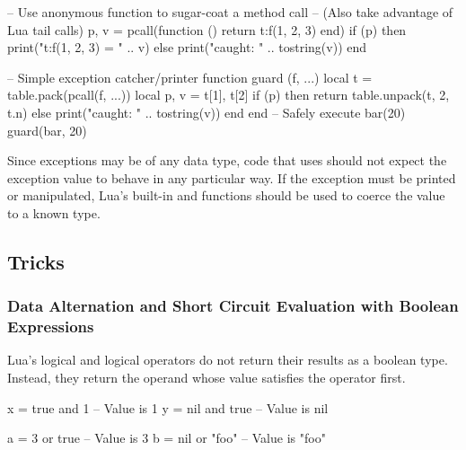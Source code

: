 \begin{LuaCode}
-- Use anonymous function to sugar-coat a method call
-- (Also take advantage of Lua tail calls)
p, v = pcall(function () return t:f(1, 2, 3) end)
if (p) then
	print("t:f(1, 2, 3) = " .. v)
else
	print("caught: " .. tostring(v))
end
\end{LuaCode}

\begin{LuaCode}
-- Simple exception catcher/printer
function guard (f, ...)
	local t = table.pack(pcall(f, ...))
	local p, v = t[1], t[2]
	if (p) then
		return table.unpack(t, 2, t.n)
	else
		print("caught: " .. tostring(v))
	end
end
-- Safely execute bar(20)
guard(bar, 20)
\end{LuaCode}

Since exceptions may be of any data type, code that uses  should
not expect the exception value to behave in any particular way.  If the
exception must be printed or manipulated, Lua's built-in  and
 functions should be used to coerce the value to a known type.

\subsection{Tricks}

\subsubsection{Data Alternation and Short Circuit Evaluation with Boolean Expressions}

Lua's logical  and logical  operators do not return
their results as a boolean type.  Instead, they return the operand whose value
satisfies the operator first.

\begin{lrbox}{\LeftBoxA}
\begin{NestedLuaCode}[linewidth=2.5in]
x = true and 1   -- Value is 1
y = nil and true -- Value is nil
\end{NestedLuaCode}
\end{lrbox}

\begin{lrbox}{\RightBoxA}
\begin{NestedLuaCode}[linewidth=2.5in]
a = 3 or true    -- Value is 3
b = nil or "foo" -- Value is "foo"
\end{NestedLuaCode}
\end{lrbox}

